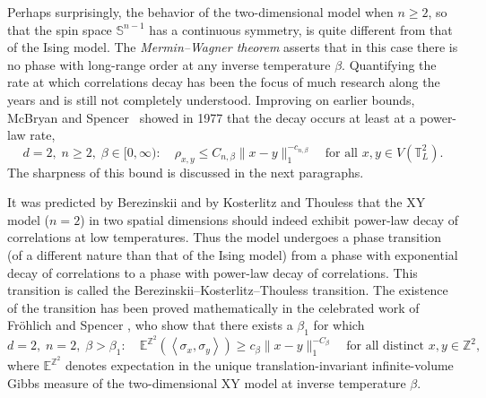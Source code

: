 \documentclass[12pt,reqno]{article}
\def\E{\mathbb{E}}
\def\Z{\mathbb{Z}}
\def\T{\mathbb{T}}
\begin{document}
\medbreak
{} Perhaps surprisingly, the behavior of the two-dimensional
model when $n\ge2$, so that the spin space $\mathbb S^{n-1}$ has a
continuous symmetry, is quite different from that of the Ising
model. The \emph{Mermin--Wagner theorem} \cite{mermin1966absence, mermin1967absence} asserts that
in this case there is no phase with long-range order at any inverse
temperature $\beta$. Quantifying the rate at which correlations
decay has been the focus of much research along the years \cite{hohenberg1967existence,jasnow1969broken,polyakov1975interaction,dobrushin1975absence,shlosman1977absence, shlosman1978decrease,pfister1981symmetry,simon1981rigorous,FroSpe81,ito1982clustering,bonato1982mermin,messager1984upper,naddaf1997decay,ioffe20022d,gagnebin2014upper}
and is still not completely understood. Improving on earlier bounds, McBryan and Spencer~\cite{McBSpe77} showed in 1977 that the decay occurs at
least at a power-law rate,
\begin{equation}\label{eq:algebraic_decay_Mermin_Wagner}
  d=2,\; n\ge 2,\; \beta\in[0,\infty)\colon\quad \rho_{x,y}\le C_{n,\beta}\|x-y\|_1^{-c_{n,\beta}}\quad\text{for all $x,y\in V(\T_L^2)$}.
\end{equation}
The sharpness of this bound is discussed in the next paragraphs.

\medbreak
{} It was predicted by Berezinskii \cite{Ber72} and by
Kosterlitz and Thouless \cite{KosTho72, KosTho73} that the XY model
($n=2$) in two spatial dimensions should indeed exhibit power-law
decay of correlations at low temperatures. Thus the model undergoes
a phase transition (of a different nature than that of the Ising
model) from a phase with exponential decay of correlations to a
phase with power-law decay of correlations. This transition is
called the Berezinskii--Kosterlitz--Thouless transition. The existence
of the transition has been proved mathematically in the celebrated
work of Fr\"ohlich and Spencer \cite{FroSpe81}, who show that there
exists a $\beta_1$ for which
\begin{equation}\label{eq:polynomial_decay_lower_bound}
  d=2,\; n=2,\; \beta>\beta_1\colon\quad \E^{\Z^2}(\left\langle\sigma_x,\sigma_y\right\rangle)\ge c_\beta\|x-y\|_1^{-C_\beta}\quad\text{for all distinct $x,y\in \Z^2$},
\end{equation}
where $\E^{\Z^2}$ denotes expectation in the unique \cite{bricmont1977uniqueness} translation-invariant infinite-volume Gibbs measure of the two-dimensional XY model at inverse temperature $\beta$.
\end{document}
